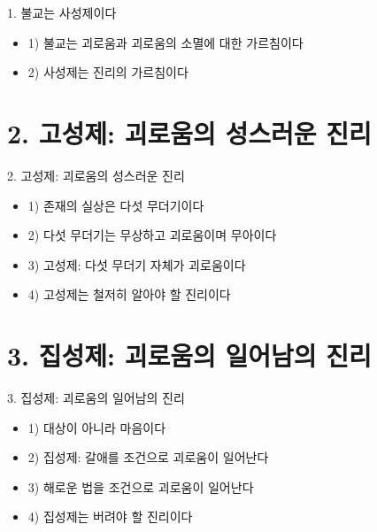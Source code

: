 \documentclass[aspectratio=1610,14pt,xcolor=pdftex,dvipsnames,table,handout]{beamer}
\begin{document}
		\begin{frame} [t,plain]
			\begin{block} {1. 불교는 사성제이다}
			\begin{itemize}
				\item 1) 불교는 괴로움과 괴로움의 소멸에 대한 가르침이다
				\item 2) 사성제는 진리의 가르침이다
			\end{itemize}
			\end{block}
		\end{frame}

		\section{2. 고성제: 괴로움의 성스러운 진리}
		\frame [plain] {\sectionpage}

		\begin{frame} [t,plain]
			\begin{block} {2. 고성제: 괴로움의 성스러운 진리}
			\begin{itemize}
				\item 1) 존재의 실상은 다섯 무더기이다
				\item 2) 다섯 무더기는 무상하고 괴로움이며 무아이다
				\item 3) 고성제: 다섯 무더기 자체가 괴로움이다
				\item 4) 고성제는 철저히 알아야 할 진리이다
			\end{itemize}
			\end{block}
		\end{frame}

		\section{3. 집성제: 괴로움의 일어남의 진리}
		\frame [plain] {\sectionpage}

		\begin{frame} [t,plain]
			\begin{block} {3. 집성제: 괴로움의 일어남의 진리}
			\begin{itemize}
				\item 1) 대상이 아니라 마음이다
				\item 2) 집성제: 갈애를 조건으로 괴로움이 일어난다
				\item 3) 해로운 법을 조건으로 괴로움이 일어난다
				\item 4) 집성제는 버려야 할 진리이다
			\end{itemize}
			\end{block}
		\end{frame}
\end{document}
